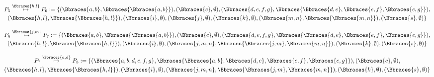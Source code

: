 \begin{solution}
\begin{enumerate}[label = \arabic*.]
    \begin{center}
        
    \end{center}

    \begin{multline*}
        P_5
        \stackrel
        {
            \Bbraces{h, l}
        }{
            \mapsto
        }
        P_6 :=
        \{
            (\Bbraces{a, b}, \Bbraces{\Bbraces{a, b}}),
            (\Bbraces{c}, \emptyset),
            (\Bbraces{d, e, f, g}, \Bbraces{\Bbraces{d, e}, \Bbraces{e, f}, \Bbraces{e, g}}), \\
            (\Bbraces{h, l}, \Bbraces{\Bbraces{h, l}}),
            (\Bbraces{i}, \emptyset),
            (\Bbraces{j}, \emptyset),
            (\Bbraces{k}, \emptyset),
            (\Bbraces{m, n}, \Bbraces{\Bbraces{m, n}}),
            (\Bbraces{s}, \emptyset)
        \}
    \end{multline*}

    \begin{center}
        
    \end{center}

    \begin{multline*}
        P_6
        \stackrel
        {
            \Bbraces{j, m}
        }{
            \mapsto
        }
        P_7 :=
        \{
            (\Bbraces{a, b}, \Bbraces{\Bbraces{a, b}}),
            (\Bbraces{c}, \emptyset),
            (\Bbraces{d, e, f, g}, \Bbraces{\Bbraces{d, e}, \Bbraces{e, f}, \Bbraces{e, g}}), \\
            (\Bbraces{h, l}, \Bbraces{\Bbraces{h, l}}),
            (\Bbraces{i}, \emptyset),
            (\Bbraces{j, m, n}, \Bbraces{\Bbraces{j, m}, \Bbraces{m, n}}),
            (\Bbraces{k}, \emptyset),
            (\Bbraces{s}, \emptyset)
        \}
    \end{multline*}

    \begin{center}
        
    \end{center}

    \begin{multline*}
        P_7
        \stackrel
        {
            \Bbraces{a, d}
        }{
            \mapsto
        }
        P_8 :=
        \{
            (\Bbraces{a, b, d, e, f, g}, \Bbraces{\Bbraces{a, b}, \Bbraces{d, e}, \Bbraces{e, f}, \Bbraces{e, g}}),
            (\Bbraces{c}, \emptyset), \\
            (\Bbraces{h, l}, \Bbraces{\Bbraces{h, l}}),
            (\Bbraces{i}, \emptyset),
            (\Bbraces{j, m, n}, \Bbraces{\Bbraces{j, m}, \Bbraces{m, n}}),
            (\Bbraces{k}, \emptyset),
            (\Bbraces{s}, \emptyset)
        \}
    \end{multline*}


\end{enumerate}
\end{solution}
